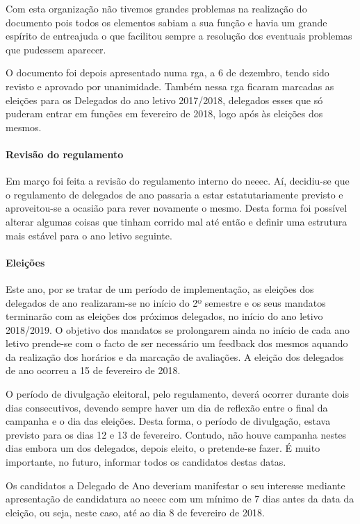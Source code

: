 Com esta organização não tivemos grandes problemas na realização do documento pois todos os elementos sabiam a sua função e havia um grande espírito de entreajuda o que facilitou sempre a resolução dos eventuais problemas que pudessem aparecer.

O documento foi depois apresentado numa \acrshort{rga}, a 6 de dezembro, tendo sido revisto e aprovado por unanimidade. Também nessa \acrshort{rga} ficaram marcadas as eleições para os Delegados do ano letivo 2017/2018, delegados esses que só puderam entrar em funções em fevereiro de 2018, logo após às eleições dos mesmos.

\paragraph{Revisão do regulamento}

Em março foi feita a revisão do regulamento interno do \acrshort{neeec}. Aí, decidiu-se que o regulamento de delegados de ano passaria a estar estatutariamente previsto e aproveitou-se a ocasião para rever novamente o mesmo. Desta forma foi possível alterar algumas coisas que tinham corrido mal até então e definir uma estrutura mais estável para o ano letivo seguinte.

\paragraph{Eleições}

Este ano, por se tratar de um período de implementação, as eleições dos delegados de ano realizaram-se no início do 2º semestre e os seus mandatos terminarão com as eleições dos próximos delegados, no início do ano letivo 2018/2019. O objetivo dos mandatos se prolongarem ainda no início de cada ano letivo prende-se com o facto de ser necessário um feedback dos mesmos aquando da realização dos horários e da marcação de avaliações. A eleição dos delegados de ano ocorreu a 15 de fevereiro de 2018.

O período de divulgação eleitoral, pelo regulamento, deverá ocorrer durante dois dias consecutivos, devendo sempre haver um dia de reflexão entre o final da campanha e o dia das eleições. Desta forma, o período de divulgação, estava previsto para os dias 12 e 13 de fevereiro. Contudo, não houve campanha nestes dias embora um dos delegados, depois eleito, o pretende-se fazer. É muito importante, no futuro, informar todos os candidatos destas datas.

Os candidatos a Delegado de Ano deveriam manifestar o seu interesse mediante apresentação de candidatura ao \acrshort{neeec} com um mínimo de 7 dias antes da data da eleição, ou seja, neste caso, até ao dia 8 de fevereiro de 2018.

